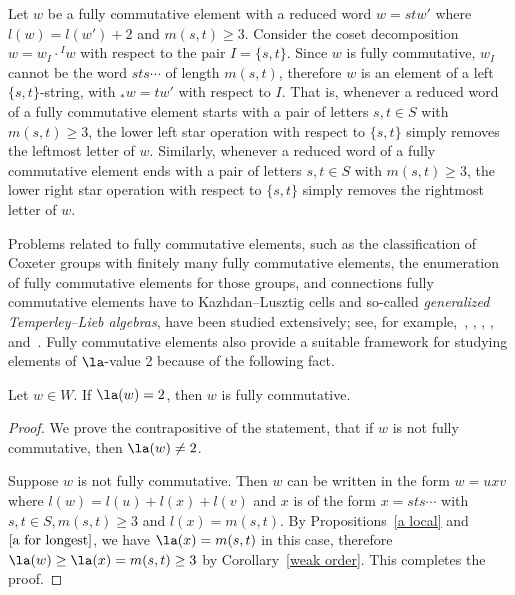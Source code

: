  \begin{rema}
 \label{removal}
 Let $w$ be a fully commutative element with a reduced word $w=stw'$ where
 $l(w)=l(w')+2$ and $m(s,t)\ge 3$. Consider the coset decomposition
 $w=w_I\cdot {}^I w$ with respect to the pair $I=\{s,t\}$. Since $w$ is
 fully commutative, $w_I$ cannot be the word $sts\cdots$ of length
 $m(s,t)$, therefore $w$ is an element of a left $\{s,t\}$-string, with ${}_* w=tw'$ with respect to $I$. That is, whenever a reduced word
 of a fully commutative element starts with a pair of letters $s,t\in S$
 with $m(s,t)\ge 3$, the lower left star operation with respect to
 $\{s,t\}$ simply removes the leftmost letter of $w$. Similarly,
 whenever a reduced word of a fully commutative element ends with a pair
 of letters $s,t\in S$ with $m(s,t)\ge 3$, the lower right star
 operation with respect to $\{s,t\}$ simply removes the rightmost letter
 of $w$. \end{rema}


 Problems related to fully commutative elements, such as the classification of
 Coxeter groups with finitely many fully commutative elements, the
 enumeration of fully commutative elements for those groups, and 
 connections fully commutative elements have to Kazhdan--Lusztig cells and
 so-called \emph{generalized
 Temperley--Lieb algebras}, have been studied
 extensively; see, for example,~\cite{BJN}, \cite{Fan}, \cite{FCcells}, \cite{Shi}, \cite{FC} and~\cite{FC2}.
 Fully commutative elements also provide a suitable framework for studying elements of $\la$-value 2 because of the following fact.

 \begin{prop}
 \label{a2 is fc}
 Let $w\in W$. If $\la(w)=2$, then $w$ is fully commutative. 
 \end{prop}
 \begin{proof}
 We prove the contrapositive of the statement, \ie that if $w$ is not fully
 commutative, then $\la(w)\neq 2$. 

 Suppose $w$ is not fully commutative. Then $w$ can be written in the form
 $w=uxv$ where $l(w)=l(u)+l(x)+l(v)$ and $x$ is of the form
 $x=sts\cdots$ with $s,t\in S, m(s,t)\ge 3$ and $l(x)=m(s,t)$. By Propositions~\ref{a local} and $\ref{a for longest}$, we have $\la(x)=m(s,t)$ in this case, therefore $\la(w)\ge \la(x)=m(s,t)\ge 3$ by
 Corollary~\ref{weak order}. This completes the proof.
 \end{proof}

